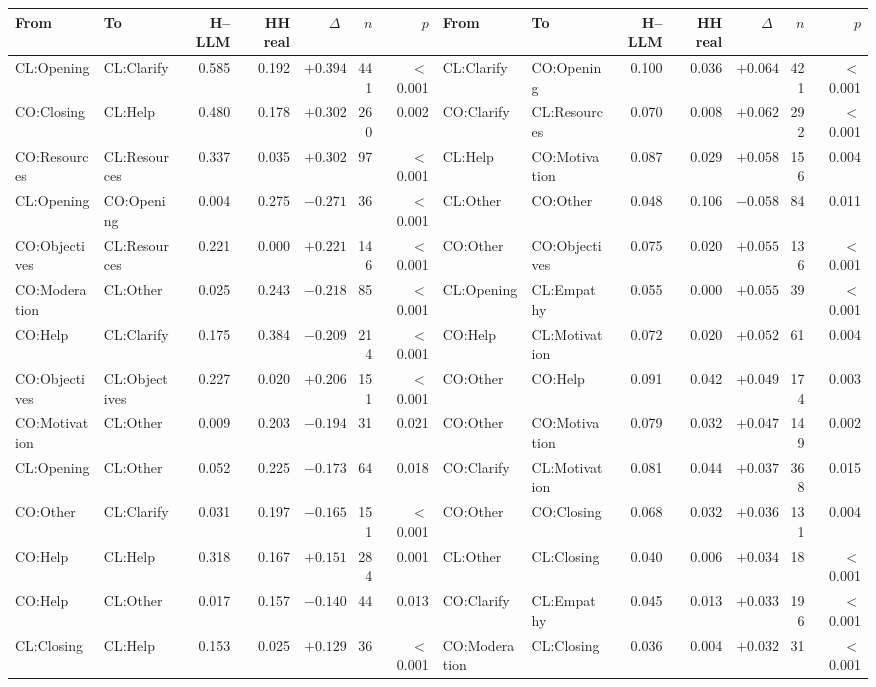 \begin{tabular}{llrrrrr@{\hspace{1.5em}}llrrrrr}
\toprule
From & To & H--LLM & HH real & $\Delta$ & $n$ & $p$ & From & To & H--LLM & HH real & $\Delta$ & $n$ & $p$ \\
\midrule
CL:Opening & CL:Clarify & 0.585 & 0.192 & $+0.394$ & 441 & $<$0.001 & CL:Clarify & CO:Opening & 0.100 & 0.036 & $+0.064$ & 421 & $<$0.001 \\
CO:Closing & CL:Help & 0.480 & 0.178 & $+0.302$ & 260 & 0.002 & CO:Clarify & CL:Resources & 0.070 & 0.008 & $+0.062$ & 292 & $<$0.001 \\
CO:Resources & CL:Resources & 0.337 & 0.035 & $+0.302$ & 97 & $<$0.001 & CL:Help & CO:Motivation & 0.087 & 0.029 & $+0.058$ & 156 & 0.004 \\
CL:Opening & CO:Opening & 0.004 & 0.275 & $-0.271$ & 36 & $<$0.001 & CL:Other & CO:Other & 0.048 & 0.106 & $-0.058$ & 84 & 0.011 \\
CO:Objectives & CL:Resources & 0.221 & 0.000 & $+0.221$ & 146 & $<$0.001 & CO:Other & CO:Objectives & 0.075 & 0.020 & $+0.055$ & 136 & $<$0.001 \\
CO:Moderation & CL:Other & 0.025 & 0.243 & $-0.218$ & 85 & $<$0.001 & CL:Opening & CL:Empathy & 0.055 & 0.000 & $+0.055$ & 39 & $<$0.001 \\
CO:Help & CL:Clarify & 0.175 & 0.384 & $-0.209$ & 214 & $<$0.001 & CO:Help & CL:Motivation & 0.072 & 0.020 & $+0.052$ & 61 & 0.004 \\
CO:Objectives & CL:Objectives & 0.227 & 0.020 & $+0.206$ & 151 & $<$0.001 & CO:Other & CO:Help & 0.091 & 0.042 & $+0.049$ & 174 & 0.003 \\
CO:Motivation & CL:Other & 0.009 & 0.203 & $-0.194$ & 31 & 0.021 & CO:Other & CO:Motivation & 0.079 & 0.032 & $+0.047$ & 149 & 0.002 \\
CL:Opening & CL:Other & 0.052 & 0.225 & $-0.173$ & 64 & 0.018 & CO:Clarify & CL:Motivation & 0.081 & 0.044 & $+0.037$ & 368 & 0.015 \\
CO:Other & CL:Clarify & 0.031 & 0.197 & $-0.165$ & 151 & $<$0.001 & CO:Other & CO:Closing & 0.068 & 0.032 & $+0.036$ & 131 & 0.004 \\
CO:Help & CL:Help & 0.318 & 0.167 & $+0.151$ & 284 & 0.001 & CL:Other & CL:Closing & 0.040 & 0.006 & $+0.034$ & 18 & $<$0.001 \\
CO:Help & CL:Other & 0.017 & 0.157 & $-0.140$ & 44 & 0.013 & CO:Clarify & CL:Empathy & 0.045 & 0.013 & $+0.033$ & 196 & $<$0.001 \\
CL:Closing & CL:Help & 0.153 & 0.025 & $+0.129$ & 36 & $<$0.001 & CO:Moderation & CL:Closing & 0.036 & 0.004 & $+0.032$ & 31 & $<$0.001 \\

\end{tabular}
